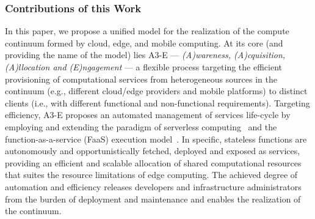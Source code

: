 %


\subsubsection*{Contributions of this Work}


In this paper, we propose a unified model for the realization of the compute continuum formed by cloud, edge, and mobile computing. At its core (and providing the name of the model) lies A3-E --- \textit{(A)wareness, (A)cquisition, (A)llocation and (E)ngagement} --- a flexible process targeting the efficient provisioning of computational services from heterogeneous sources in the continuum (e.g., different cloud/edge providers and mobile platforms) to distinct clients (i.e., with different functional and non-functional requirements). 
Targeting efficiency, A3-E proposes an automated management of services life-cycle by employing and extending the paradigm of serverless computing~\cite{Hendrickson:2016,baldini2017serverless,GarrigaMendonca2017} and the function-as-a-service (FaaS) execution model~\cite{MateosFaaster17}. In specific, stateless functions are autonomously and opportunistically fetched, deployed and exposed as services, providing an efficient and scalable allocation of shared computational resources that suites the resource limitations of edge computing. The achieved degree of automation and efficiency releases developers and infrastructure administrators from the burden of deployment and maintenance and enables the realization of the continuum.

